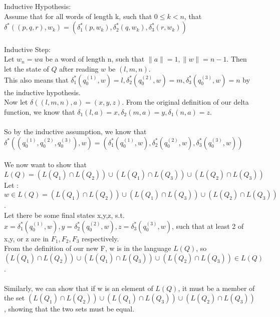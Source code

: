 \begin{enumerate}
\begin{enumerate}
      Inductive Hypothesis:\\
      Assume that for all words of length k, such that $0 \leq k < n$, that $\delta^* ((p,q,r), w_k) = (\delta_1^*(p,w_k), \delta_2^*(q,w_k), \delta_3^*(r,w_k))$\\\\

      Inductive Step:\\
      Let $w_n = wa$ be a word of length n, such that $\|a\| = 1, \|w\| = n-1$. Then let the state of $Q$ after reading $w$ be $(l,m,n)$.\\
      This also means that $\delta_1^*(q_0^{(1)}, w) = l, \delta_2^*(q_0^{(2)}, w) = m, \delta_3^*(q_0^{(3)}, w) = n$ by the inductive hypothesis.\\
      Now let $\delta((l,m,n), a) = (x,y,z)$. From the original definition of our delta function, we know that $\delta_1(l,a) = x, \delta_2(m,a) = y, \delta_1(n,a) = z$.\\\\
      So by the inductive assumption, we know that $\delta^*((q_0^{(1)},q_0^{(2)},q_0^{(3)}), w) = (\delta_1^*(q_0^{(1)}, w),\delta_2^*(q_0^{(2)}, w), \delta_3^*(q_0^{(3)}, w))$\\\\

      We now want to show that $L(Q) = (L(Q_1) \cap L(Q_2)) \cup (L(Q_1) \cap L(Q_3)) \cup (L(Q_2) \cap L(Q_3))$\\
      Let : $w \in L(Q) = (L(Q_1) \cap L(Q_2)) \cup (L(Q_1) \cap L(Q_3)) \cup (L(Q_2) \cap L(Q_3))$. \\
      Let there be some final states x,y,z, s.t. $x = \delta_1^*(q_0^{(1)},w), y = \delta_2^*(q_0^{(2)},w), z = \delta_3^*(q_0^{(3)},w)$, such that at least 2 of x,y, or z are in $F_1, F_2, F_3$ respectively.\\
      From the definition of our new F, w is in the language $L(Q)$, so $(L(Q_1) \cap L(Q_2)) \cup (L(Q_1) \cap L(Q_3)) \cup (L(Q_2) \cap L(Q_3)) \in L(Q)$.\\\\

      Similarly, we can show that if w is an element of $L(Q)$, it must be a member of the set $(L(Q_1) \cap L(Q_2)) \cup (L(Q_1) \cap L(Q_3)) \cup (L(Q_2) \cap L(Q_3))$, showing that the two sets must be equal.
      
  \end{enumerate}

\end{enumerate}

